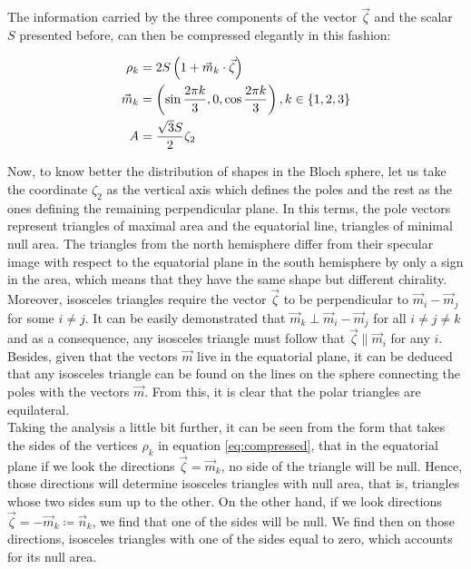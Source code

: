 The information carried by the three components of the vector $\vec{\zeta}$ and the scalar $S$ presented before, can then be compressed elegantly in this fashion:

\begin{equation}
\begin{aligned}
\rho_k &= 2S\left( 1+\vec{m}_k\cdot\vec{\zeta} \right)\\
\vec{m}_k &= \left( \sin{\frac{2\pi k}{3}},0,\cos{\frac{2\pi k}{3}} \right), k \in \left\lbrace 1,2, 3 \right\rbrace\\
A &= \frac{\sqrt{3}S}{2} \zeta_2
\end{aligned}
\label{eq:compressed}
\end{equation}

Now, to know better the distribution of shapes in the Bloch sphere, let us take the coordinate $\zeta_2$ as the vertical axis which defines the poles and the rest as the ones defining the remaining perpendicular plane. In this terms, the pole vectors represent triangles of maximal area and the equatorial line, triangles of minimal null area. The triangles from the north hemisphere differ from their specular image with respect to the equatorial plane in the south hemisphere by only a sign in the area, which means that they have the same shape but different chirality.\\

Moreover, isosceles triangles require the vector $\vec{\zeta}$ to be perpendicular to $\vec{m}_i-\vec{m}_j$ for some $i \neq j$. It can be easily demonstrated that $\vec{m}_k \perp \vec{m}_i-\vec{m}_j$ for all $i \neq j \neq k$ and as a consequence, any isosceles triangle must follow that $\vec{\zeta}\parallel\vec{m}_i$ for any $i$. Besides, given that the vectors $\vec{m}$ live in the equatorial plane, it can be deduced that any isosceles triangle can be found on the lines on the sphere connecting the poles with the vectors $\vec{m}$. From this, it is clear that the polar triangles are equilateral.\\

Taking the analysis a little bit further, it can be seen from the form that takes the sides of the vertices $\rho_k$ in equation \eqref{eq:compressed}, that in the equatorial plane if we look the directions $\vec{\zeta} = \vec{m}_k$, no side of the triangle will be null. Hence, those directions will determine isosceles triangles with null area, that is, triangles whose two sides sum up to the other. On the other hand, if we look directions $\vec{\zeta} = -\vec{m}_k \coloneqq \vec{n}_k$, we find that one of the sides will be null. We find then on those directions, isosceles triangles with one of the sides equal to zero, which accounts for its null area.\\

